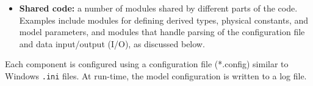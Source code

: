 \begin{itemize}
\item {\bf Shared code:} a number of modules shared by different parts of the code. 
Examples include modules for defining derived types, 
physical constants, and model parameters, and modules that handle parsing of 
the configuration file and data input/output (I/O), as discussed below.


\end{itemize}
%

%


Each component is configured using a configuration file (*.config) 
similar to Windows \texttt{.ini} files. At run-time, the model configuration is written
to a log file. 

